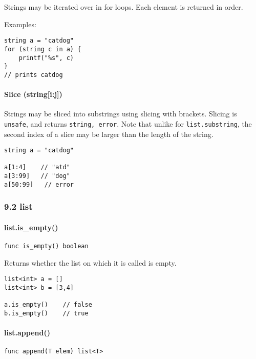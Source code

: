 Strings may be iterated over in for loops. Each element is returned in
order.

Examples:

\begin{verbatim}
string a = "catdog"
for (string c in a) {
    printf("%s", c)
}
// prints catdog
\end{verbatim}

\paragraph{Slice (string{[}i:j{]})}\label{slice-stringij}

Strings may be sliced into substrings using slicing with brackets.
Slicing is \texttt{unsafe}, and returns \texttt{string, error}. Note
that unlike for \texttt{list.substring}, the second index of a slice may
be larger than the length of the string.

\begin{verbatim}
string a = "catdog"

a[1:4]    // "atd"
a[3:99]   // "dog"
a[50:99]   // error
\end{verbatim}

\subsubsection*{9.2 list}\label{list-1}

\paragraph{list.is\_empty()}\label{list.isux5fempty}

\begin{verbatim}
func is_empty() boolean
\end{verbatim}

Returns whether the list on which it is called is empty.

\begin{verbatim}
list<int> a = []
list<int> b = [3,4]

a.is_empty()    // false
b.is_empty()    // true
\end{verbatim}

\paragraph{list.append()}\label{list.append}

\begin{verbatim}
func append(T elem) list<T>
\end{verbatim}


